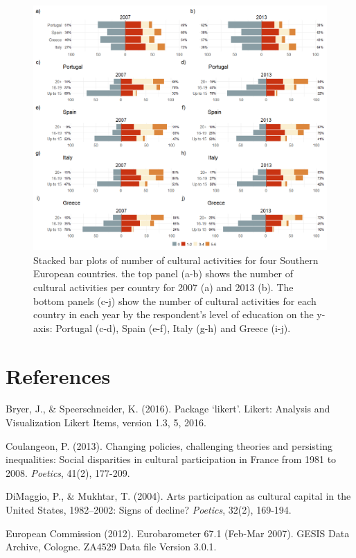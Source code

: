 \documentclass{article}
\begin{document}
\begin{figure}
    \centering
    \includegraphics[width=1.0\textwidth]{Plots/cult-cat2-by-year-by-country-combo.png}
    \caption{Stacked bar plots of number of cultural activities for four Southern European countries. the top panel (a-b) shows the number of cultural activities per country for 2007 (a) and 2013 (b). The bottom panels (c-j) show the number of cultural activities for each country in each year by the respondent's level of education on the y-axis: Portugal (c-d), Spain (e-f), Italy (g-h) and Greece (i-j).}
    \label{fig: main}
\end{figure}

\section*{References}
\noindent

Bryer, J., \& Speerschneider, K. (2016). Package ‘likert’. Likert: Analysis and Visualization Likert Items, version 1.3, 5, 2016.

Coulangeon, P. (2013). Changing policies, challenging theories and persisting inequalities: Social disparities in cultural participation in France from 1981 to 2008. \textit{Poetics}, 41(2), 177-209.

DiMaggio, P., \& Mukhtar, T. (2004). Arts participation as cultural capital in the United States, 1982–2002: Signs of decline? \textit{Poetics}, 32(2), 169-194.

European Commission (2012). Eurobarometer 67.1 (Feb-Mar 2007). GESIS Data Archive, Cologne. ZA4529 Data file Version 3.0.1. 
\end{document}
